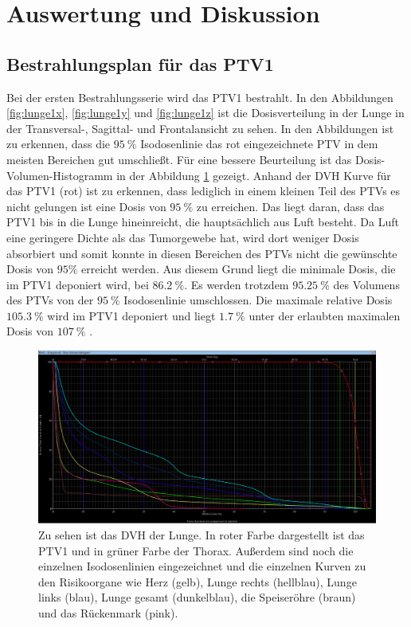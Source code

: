 \section{Auswertung und Diskussion}
\label{sec:AuswertungDiskussion}

\subsection*{Bestrahlungsplan für das PTV1}
Bei der ersten Bestrahlungsserie wird das PTV1 bestrahlt. In den Abbildungen \ref{fig:lunge1x}, \ref{fig:lunge1y} und \ref{fig:lunge1z}
ist die Dosisverteilung in der Lunge in der
Transversal-, Sagittal- und Frontalansicht zu sehen. In den Abbildungen ist zu erkennen, dass die $\SI{95}{\percent}$ Isodosenlinie das
rot eingezeichnete PTV in dem meisten Bereichen gut umschließt.
Für eine bessere Beurteilung ist das Dosis-Volumen-Histogramm in der Abbildung \ref{fig:lunge1dvh} gezeigt.
Anhand der DVH Kurve für das PTV1 (rot) ist zu erkennen, dass lediglich in einem kleinen Teil des PTVs es
nicht gelungen ist eine Dosis von $\SI{95}{\percent}$ zu erreichen.
Das liegt daran, dass das PTV1 bis in die Lunge hineinreicht, die hauptsächlich aus Luft besteht.
Da Luft eine geringere Dichte als das Tumorgewebe hat, wird dort weniger Dosis absorbiert und somit konnte in diesen Bereichen des PTVs nicht
die gewünschte Dosis von $95\%$ erreicht werden.
Aus diesem Grund liegt die minimale Dosis, die im PTV1 deponiert wird, bei $\SI{86.2}{\percent}$.
Es werden trotzdem $\SI{95,25}{\percent}$ des Volumens des PTVs von der $\SI{95}{\percent}$ Isodosenlinie umschlossen.
Die maximale relative Dosis $\SI{105.3}{\percent}$ wird im PTV1 deponiert und liegt $\SI{1.7}{\percent}$ unter der
erlaubten maximalen Dosis von $\SI{107}{\percent}$ \cite{ICRU}.


\begin{figure}[H]
	\centering
	\includegraphics[width=\linewidth]{Bilder/Lunge1_DVH}
	\caption{Zu sehen ist das DVH der Lunge. In roter Farbe dargestellt ist das PTV1 und in grüner Farbe der Thorax. Außerdem sind noch die einzelnen Isodosenlinien eingezeichnet und die einzelnen Kurven zu den Risikoorgane wie Herz (gelb), Lunge rechts (hellblau), Lunge links (blau), Lunge gesamt (dunkelblau), die Speiseröhre (braun) und das Rückenmark (pink).}
	\label{fig:lunge1dvh}
\end{figure}

